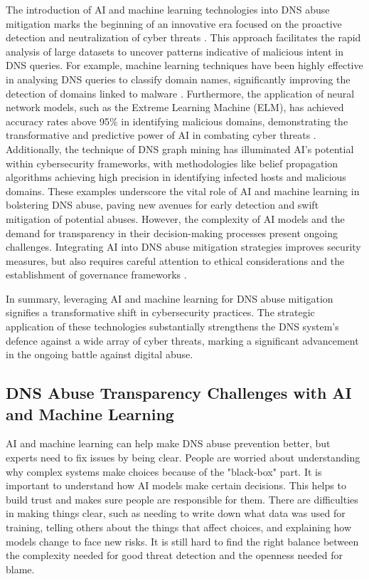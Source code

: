 The introduction of AI and machine learning technologies into DNS abuse mitigation marks the beginning of an innovative era focused on the proactive detection and neutralization of cyber threats \cite{tariq2023critical}.  This approach facilitates the rapid analysis of large datasets to uncover patterns indicative of malicious intent in DNS queries. For example, machine learning techniques have been highly effective in analysing DNS queries to classify domain names, significantly improving the detection of domains linked to malware \cite{LiMaliciousDomainDetection2020}. Furthermore, the application of neural network models, such as the Extreme Learning Machine (ELM), has achieved accuracy rates above 95\% in identifying malicious domains, demonstrating the transformative and predictive power of AI in combating cyber threats \cite{ZouDNSGraphMining2015}. Additionally, the technique of DNS graph mining has illuminated AI's potential within cybersecurity frameworks, with methodologies like belief propagation algorithms achieving high precision in identifying infected hosts and malicious domains. These examples underscore the vital role of AI and machine learning in bolstering DNS abuse, paving new avenues for early detection and swift mitigation of potential abuses. However, the complexity of AI models and the demand for transparency in their decision-making processes present ongoing challenges. Integrating AI into DNS abuse mitigation strategies improves security measures, but also requires careful attention to ethical considerations and the establishment of governance frameworks \cite{AntonakakisMalwareDomainsUpperDNS2011}.

In summary, leveraging AI and machine learning for DNS abuse mitigation signifies a transformative shift in cybersecurity practices. The strategic application of these technologies substantially strengthens the DNS system's defence against a wide array of cyber threats, marking a significant advancement in the ongoing battle against digital abuse.

\subsection{DNS Abuse Transparency Challenges with AI and Machine Learning}

AI and machine learning can help make DNS abuse prevention better, but experts need to fix issues by being clear. People are worried about understanding why complex systems make choices because of the "black-box" part. It is important to understand how AI models make certain decisions. This helps to build trust and makes sure people are responsible for them. There are difficulties in making things clear, such as needing to write down what data was used for training, telling others about the things that affect choices, and explaining how models change to face new risks. It is still hard to find the right balance between the complexity needed for good threat detection and the openness needed for blame.

